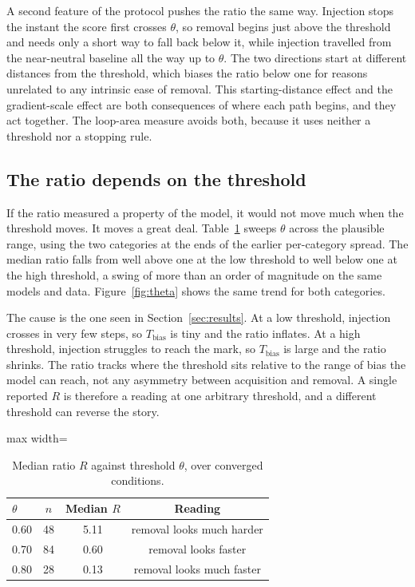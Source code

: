 \documentclass[Afour,sageh,times]{sagej}
\begin{document}
A second feature of the protocol pushes the ratio the same way. Injection stops the instant the score first crosses $\theta$, so removal begins just above the threshold and needs only a short way to fall back below it, while injection travelled from the near-neutral baseline all the way up to $\theta$. The two directions start at different distances from the threshold, which biases the ratio below one for reasons unrelated to any intrinsic ease of removal. This starting-distance effect and the gradient-scale effect are both consequences of where each path begins, and they act together. The loop-area measure avoids both, because it uses neither a threshold nor a stopping rule.

\subsection{The ratio depends on the threshold}
\label{sec:thetasweep}

If the ratio measured a property of the model, it would not move much when the threshold moves. It moves a great deal. Table~\ref{tab:theta} sweeps $\theta$ across the plausible range, using the two categories at the ends of the earlier per-category spread. The median ratio falls from well above one at the low threshold to well below one at the high threshold, a swing of more than an order of magnitude on the same models and data. Figure~\ref{fig:theta} shows the same trend for both categories.

The cause is the one seen in Section~\ref{sec:results}. At a low threshold, injection crosses in very few steps, so $T_{\mathrm{bias}}$ is tiny and the ratio inflates. At a high threshold, injection struggles to reach the mark, so $T_{\mathrm{bias}}$ is large and the ratio shrinks. The ratio tracks where the threshold sits relative to the range of bias the model can reach, not any asymmetry between acquisition and removal. A single reported $R$ is therefore a reading at one arbitrary threshold, and a different threshold can reverse the story.

\begin{table}[htbp]
\small\sf\centering
\caption{Median ratio $R$ against threshold $\theta$, over converged conditions.}
\label{tab:theta}
\begin{adjustbox}{max width=\linewidth}
\begin{tabular}{lccc}
\toprule
\textbf{$\theta$} & \textbf{$n$} & \textbf{Median $R$} & \textbf{Reading} \\
\midrule
0.60 & 48 & 5.11 & removal looks much harder \\
0.70 & 84 & 0.60 & removal looks faster \\
0.80 & 28 & 0.13 & removal looks much faster \\
\bottomrule
\end{tabular}
\end{adjustbox}
\end{table}
\end{document}
